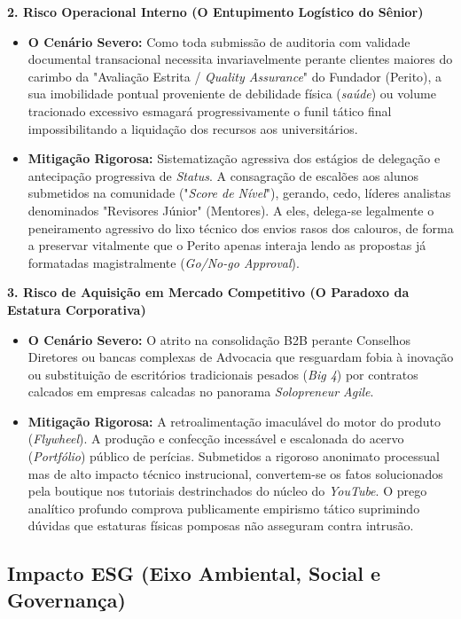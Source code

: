 \documentclass[../main.tex]{subfiles}
\begin{document}
\textbf{2. Risco Operacional Interno (O Entupimento Logístico do Sênior)}
\begin{itemize}
    \item \textbf{O Cenário Severo:} Como toda submissão de auditoria com validade documental transacional necessita invariavelmente perante clientes maiores do carimbo da "Avaliação Estrita / \textit{Quality Assurance}" do Fundador (Perito), a sua imobilidade pontual proveniente de debilidade física (\textit{saúde}) ou volume tracionado excessivo esmagará progressivamente o funil tático final impossibilitando a liquidação dos recursos aos universitários.
    \item \textbf{Mitigação Rigorosa:} Sistematização agressiva dos estágios de delegação e antecipação progressiva de \textit{Status}. A consagração de escalões aos alunos submetidos na comunidade ("\textit{Score de Nível}"), gerando, cedo, líderes analistas denominados "Revisores Júnior" (Mentores). A eles, delega-se legalmente o peneiramento agressivo do lixo técnico dos envios rasos dos calouros, de forma a preservar vitalmente que o Perito apenas interaja lendo as propostas já formatadas magistralmente (\textit{Go/No-go Approval}).
\end{itemize}

\textbf{3. Risco de Aquisição em Mercado Competitivo (O Paradoxo da Estatura Corporativa)}
\begin{itemize}
    \item \textbf{O Cenário Severo:} O atrito na consolidação B2B perante Conselhos Diretores ou bancas complexas de Advocacia que resguardam fobia à inovação ou substituição de escritórios tradicionais pesados (\textit{Big 4}) por contratos calcados em empresas calcadas no panorama \textit{Solopreneur Agile}.
    \item \textbf{Mitigação Rigorosa:} A retroalimentação imaculável do motor do produto (\textit{Flywheel}). A produção e confecção incessável e escalonada do acervo (\textit{Portfólio}) público de perícias. Submetidos a rigoroso anonimato processual mas de alto impacto técnico instrucional, convertem-se os fatos solucionados pela boutique nos tutoriais destrinchados do núcleo do \textit{YouTube}. O prego analítico profundo comprova publicamente empirismo tático suprimindo dúvidas que estaturas físicas pomposas não asseguram contra intrusão.
\end{itemize}

\subsection{Impacto ESG (Eixo Ambiental, Social e Governança)}
\end{document}
